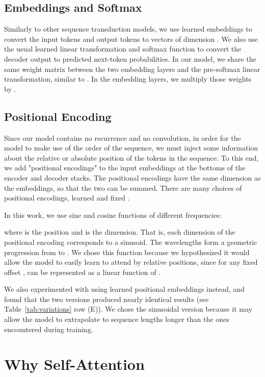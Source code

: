 \documentclass{article}
\begin{document}
\subsection{Embeddings and Softmax}
Similarly to other sequence transduction models, we use learned embeddings to convert the input tokens and output tokens to vectors of dimension .  We also use the usual learned linear transformation and softmax function to convert the decoder output to predicted next-token probabilities.  In our model, we share the same weight matrix between the two embedding layers and the pre-softmax linear transformation, similar to \citep{press2016using}.   In the embedding layers, we multiply those weights by .


\subsection{Positional Encoding}
Since our model contains no recurrence and no convolution, in order for the model to make use of the order of the sequence, we must inject some information about the relative or absolute position of the tokens in the sequence.  To this end, we add "positional encodings" to the input embeddings at the bottoms of the encoder and decoder stacks.  The positional encodings have the same dimension  as the embeddings, so that the two can be summed.   There are many choices of positional encodings, learned and fixed \citep{JonasFaceNet2017}.

In this work, we use sine and cosine functions of different frequencies:



where  is the position and  is the dimension.  That is, each dimension of the positional encoding corresponds to a sinusoid.  The wavelengths form a geometric progression from  to .  We chose this function because we hypothesized it would allow the model to easily learn to attend by relative positions, since for any fixed offset ,  can be represented as a linear function of .

We also experimented with using learned positional embeddings \citep{JonasFaceNet2017} instead, and found that the two versions produced nearly identical results (see Table~\ref{tab:variations} row (E)).  We chose the sinusoidal version because it may allow the model to extrapolate to sequence lengths longer than the ones encountered during training.
  
\section{Why Self-Attention}
\end{document}
